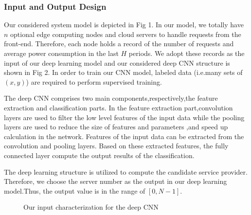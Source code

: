\documentclass[journal]{IEEEtran}
\begin{document}
\subsubsection{Input and Output Design}
Our considered system model is depicted in Fig 1. In our model, we totally have $n$ optional edge computing nodes and cloud servers to handle requests from the front-end. Therefore, each node holds a record of the number of requests and average power consumption in the last $\mathit{H}$ periods. We adopt these records as the input of our deep learning model \cite{19} and our considered deep CNN structure is shown in Fig 2. In order to train our CNN model, labeled data (i.e.many sets of $(x,y)$) are required to perform supervised training.

The deep CNN comprises two main components,respectively,the feature extraction and classification parts. In the feature extraction part,convolution layers are used to filter the low level features of the input data while the pooling layers are used to reduce the size of features and parameters ,and speed up calculation in the network. Features of the input data can be extracted from the convolution and pooling layers. Based on these extracted features, the fully connected layer compute the output results of the classification.

The deep learning structure is utilized to compute the candidate service provider. Therefore, we choose the server number as the output in our deep learning model.Thus, the output value is in the range of $[0,N-1]$.


\begin{figure}[h]
\centering
{}
 \caption{Our input characterization for the deep CNN} 
 \label{fig:label}
\end{figure}
\end{document}
